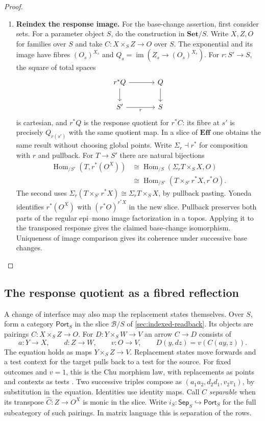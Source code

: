 \documentclass[11pt,a4paper]{article}
\theoremstyle{definition}
\theoremstyle{remark}\newaliascnt{remark}{theorem}
\newcommand{\E}{\mathbf{Eff}}
\newcommand{\Hom}{\operatorname{Hom}}
\numberwithin{equation}{section}
\begin{document}
\begin{proof}
\begin{enumerate}[titledsteps]
    \item \textbf{Reindex the response image.} For the base-change assertion, first consider sets.
For a parameter object \(S\), do the construction in \(\mathbf{Set}/S\). Write \(X,Z,O\) for families over \(S\) and take \(C:X\times_S Z\to O\) over \(S\). The exponential and its image have fibres \((O_s)^{X_s}\) and \(Q_s=\operatorname{im}(Z_s\to (O_s)^{X_s})\). For \(r:S'\to S\), the square of total spaces
\[
\begin{tikzcd}[column sep=large]
 r^*Q\arrow[r]\arrow[d]&Q\arrow[d]\\
 S'\arrow[r,"r"']&S
\end{tikzcd}
\]
is cartesian, and \(r^*Q\) is the response quotient for \(r^*C\): its fibre at \(s'\) is precisely \(Q_{r(s')}\) with the same quotient map. In a slice of \(\E\) one obtains the same result without choosing global points. Write \(\Sigma_r\dashv r^*\) for composition with \(r\) and pullback. For \(T\to S'\) there are natural bijections
\[
\begin{aligned}
 \Hom_{/S'}(T,r^*(O^X))
 &\cong \Hom_{/S}(\Sigma_rT\times_S X,O)\\
 &\cong \Hom_{/S'}(T\times_{S'}r^*X,r^*O).
\end{aligned}
\]
The second uses \(\Sigma_r(T\times_{S'}r^*X)\cong\Sigma_r T\times_S X\), by pullback pasting. Yoneda identifies \(r^*(O^X)\) with \((r^*O)^{r^*X}\) in the new slice. Pullback preserves both parts of the regular epi--mono image factorization in a topos. Applying it to the transposed response gives the claimed base-change isomorphism. Uniqueness of image comparison gives its coherence under successive base changes.\qedhere
\end{enumerate}
\end{proof}
\subsection{The response quotient as a fibred reflection}\label{sec:pairing-reflection}
A change of interface may also map the replacement states themselves. Over \(S\), form a category \(\mathsf{Port}_S\) in the slice \(\mathcal B/S\) of \cref{sec:indexed-readback}. Its objects are pairings \(C:X\times_S Z\to O\). For \(D:Y\times_S W\to V\) an arrow \(C\to D\) consists of
\[
 a:Y\to X,\qquad d:Z\to W,\qquad v:O\to V,\qquad
 D(y,dz)=v(C(ay,z)).
\]
The equation holds as maps \(Y\times_S Z\to V\). Replacement states move forwards and a test context for the target pulls back to a test for the source. For fixed outcomes and \(v=1\), this is the Chu morphism law, with replacements as points and contexts as tests \cite{pratt-chu}. Two successive triples compose as \((a_1a_2,d_2d_1,v_2v_1)\), by substitution in the equation. Identities use identity maps. Call \(C\) \emph{separable} when its transpose \(\widehat C:Z\to O^X\) is monic in the slice. Write \(i_S:\mathsf{Sep}_S\hookrightarrow\mathsf{Port}_S\) for the full subcategory of such pairings. In matrix language this is separation of the rows.
\end{document}
